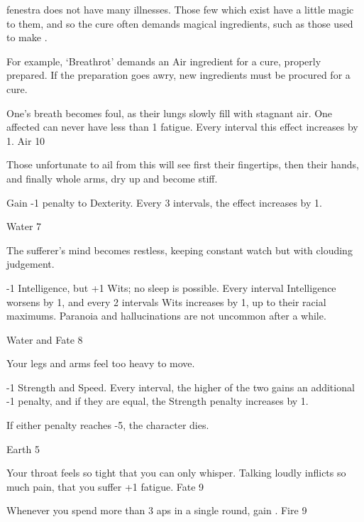 \begin{multicols}{2}

\noindent
\Gls{fenestra} does not have many illnesses.
Those few which exist have a little magic to them, and so the cure often demands magical \glspl{ingredient}, such as those used to make .

For example, `Breathrot' demands an Air \gls{ingredient} for a cure, properly prepared.
If the preparation goes awry, new \glspl{ingredient} must be procured for a cure.

%
  {
    One's breath becomes foul, as their lungs slowly fill with stagnant air.
    One affected can never have less than 1 \gls{fatigue}.
    Every \gls{interval} this effect increases by 1.
  }%
  {Air}%
  {10}

%
  {
    Those unfortunate to ail from this will see first their fingertips, then their hands, and finally whole arms, dry up and become stiff.

    Gain -1 penalty to Dexterity.
    Every 3 \glspl{interval}, the effect increases by 1.
  }%
  {Water}%
  {7}

%
  {
    The sufferer's mind becomes restless, keeping constant watch but with clouding judgement.

    -1 Intelligence, but +1 Wits; no sleep is possible.
    Every \gls{interval} Intelligence worsens by 1, and every 2 \glspl{interval} Wits increases by 1, up to their racial maximums.%
    Paranoia and hallucinations are not uncommon after a while.
  }%
  {Water and Fate}%
  {8}

%
  {Your legs and arms feel too heavy to move.

-1 Strength and Speed.
Every \gls{interval}, the higher of the two gains an additional -1 penalty, and if they are equal, the Strength penalty increases by 1.

  If either penalty reaches -5, the character dies.}%
  {Earth}%
  {5}

%
  {Your throat feels so tight that you can only whisper.
  Talking loudly inflicts so much pain, that you suffer +1 \gls{fatigue}.
  }%
{Fate}%
{9}

%
  {Whenever you spend more than 3 \glspl{ap} in a single round, gain .
  }%
  {Fire}%
  {9}

\end{multicols}
